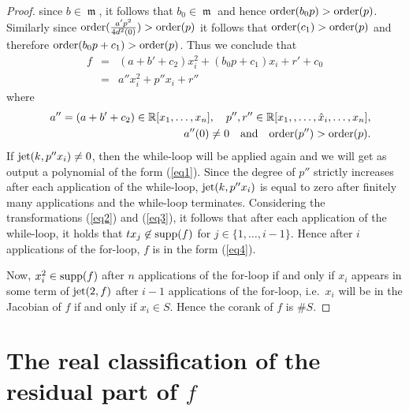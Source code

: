 \documentclass[noend]{amsproc}
\DeclareMathOperator{\m}{\mathfrak{m}}
\begin{document}
\begin{proof}
since $b\in\m$, it follows that $b_0\in\m$ and hence
$\textnormal{order}(b_0p)>\textnormal{order}(p)$. Similarly since
$\textnormal{order}(\frac{a'p^2}{4d^2(0)})>\textnormal{order}(p)$ it
follows that $\textnormal{order}(c_1)>\textnormal{order}(p)$ and therefore
$\textnormal{order}(b_0p+c_1)>\textnormal{order}(p)$. Thus we conclude that
\begin{eqnarray}
f&=&(a+b'+c_2)x_i^2+(b_0p+c_1)x_i+r'+c_0\nonumber\\
&=&a''x_i^2+p''x_i+r''\label{eq1}
\end{eqnarray}
where
\begin{eqnarray*}
&&a'' = (a+b'+c_2)\in\mathbb R[x_1,\ldots,x_n],\quad
p'',r''\in\mathbb R[x_1,,\ldots,\hat x_i,\ldots,x_n],\\
&&a''(0)\neq0\quad\textnormal{and}\quad\textnormal{order}(p'')
>\textnormal{order}(p).
\end{eqnarray*}
If $\textnormal{jet}(k,p''x_i)\neq 0$, then the while-loop will be applied
again
and we will get as output a polynomial of the form (\ref{eq1}). Since
the degree
of $p''$ strictly increases after each application of the while-loop,
$\textnormal{jet}(k,p''x_i)$ is equal to zero after finitely many applications
and the while-loop terminates. Considering the transformations  (\ref{eq2})
and
(\ref{eq3}), it follows that after each application of the while-loop,
it holds
that $tx_j\not\in\textnormal{supp}(f)$ for $j\in\{1,\ldots,i-1\}$. Hence
after $i$ applications of the for-loop, $f$ is in the form (\ref{eq4}).

Now, $x_i^2\in\textnormal{supp}(f)$ after $n$ applications of the for-loop
if and only if $x_i$ appears in some term of $\textnormal{jet}(2,f)$ after
$i-1$ applications of the for-loop, i.e.~$x_i$ will be in the Jacobian of
$f$ if and only if $x_i\in S$. Hence the corank of $f$ is $\#S$.
\end{proof}

\section{The real classification of the residual part of $f$}%
\label{TheRealClassificationOfTheResidualPart}
\end{document}
